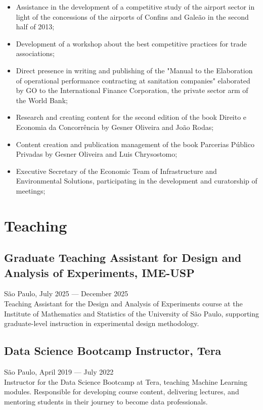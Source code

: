 \documentclass{article}
\newcommand{\jobdate}[3]{
\large
\vspace{0.05em} 
  {#1, #2 --- #3}
\vspace{0.5em} 
\\
}
\begin{document}
\begin{itemize}

\item{Assistance in the development of a competitive study of the airport sector in light of the concessions of the airports of Confins and Galeão in the second half of 2013;}
\item{Development of a workshop about the best competitive practices for trade associations;}
\item{Direct presence in writing and publishing of the "Manual to the Elaboration of operational performance contracting at sanitation companies" elaborated by GO to the International Finance Corporation, the private sector arm of the World Bank;}
\item{Research and creating content for the second edition of the book Direito e Economia da Concorrência by Gesner Oliveira and João Rodas;}
\item{Content creation and publication management of the book Parcerias Público Privadas by Gesner Oliveira and Luis Chrysostomo;}
\item{Executive Secretary of the Economic Team of Infrastructure and Environmental Solutions, participating in the development and curatorship of meetings;}

\end{itemize}

\section{Teaching}

\subsection{Graduate Teaching Assistant for Design and Analysis of Experiments, IME-USP}
\jobdate{São Paulo}{July 2025}{December 2025}
Teaching Assistant for the Design and Analysis of Experiments course at the Institute of Mathematics and Statistics of the University of São Paulo, supporting graduate-level instruction in experimental design methodology.

\vspace{1em}

\subsection{Data Science Bootcamp Instructor, Tera}
\jobdate{São Paulo}{April 2019}{July 2022}
Instructor for the Data Science Bootcamp at Tera, teaching Machine Learning modules. Responsible for developing course content, delivering lectures, and mentoring students in their journey to become data professionals.
\end{document}
